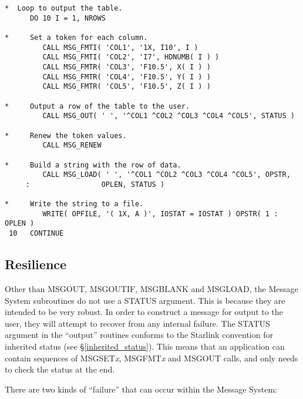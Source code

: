 \documentclass[twoside,11pt]{article}
\newcommand{\htmlref}[2]{#1}
\newcommand{\latex}[1]{#1}
\newcommand{\xlabel}[1]{}
\renewcommand{\_}{\texttt{\symbol{95}}}
\begin{document}
\begin {small}
\begin{verbatim}
*  Loop to output the table.
      DO 10 I = 1, NROWS

*     Set a token for each column.
         CALL MSG_FMTI( 'COL1', '1X, I10', I )
         CALL MSG_FMTI( 'COL2', 'I7', HDNUMB( I ) )
         CALL MSG_FMTR( 'COL3', 'F10.5', X( I ) )
         CALL MSG_FMTR( 'COL4', 'F10.5', Y( I ) )
         CALL MSG_FMTR( 'COL5', 'F10.5', Z( I ) )

*     Output a row of the table to the user.
         CALL MSG_OUT( ' ', '^COL1 ^COL2 ^COL3 ^COL4 ^COL5', STATUS )

*     Renew the token values.
         CALL MSG_RENEW

*     Build a string with the row of data.
         CALL MSG_LOAD( ' ', '^COL1 ^COL2 ^COL3 ^COL4 ^COL5', OPSTR,
     :                 OPLEN, STATUS )

*     Write the string to a file.
         WRITE( OPFILE, '( 1X, A )', IOSTAT = IOSTAT ) OPSTR( 1 : OPLEN )
 10   CONTINUE
\end{verbatim}
\end {small}


\subsection{\xlabel{resilience}Resilience}

Other than MSG\_OUT, MSG\_OUTIF, MSG\_BLANK and MSG\_LOAD, the Message System 
subroutines do not use a STATUS argument. 
This is because they are intended to be very robust.
In order to construct a message for output to the user, they will attempt to 
recover from any internal failure. 
The STATUS argument in the ``output'' routines conforms to the Starlink
convention for 
\htmlref
{inherited status}{inherited_status}\latex{ (see \S\ref{inherited_status})}.
This means that an application can contain sequences of MSG\_SET\textit{x}, 
MSG\_FMT\textit{x} and MSG\_OUT calls, and only needs to check the status at the 
end.

There are two kinds of ``failure'' that can occur within the Message
System:
\end{document}
